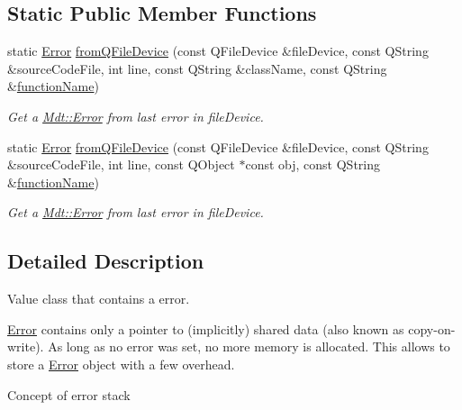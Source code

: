 \subsection*{Static Public Member Functions}
\begin{DoxyCompactItemize}
\item 
static \hyperlink{class_mdt_1_1_error}{Error} \hyperlink{class_mdt_1_1_error_ab8b7aaf497879d1ca16784fae96d3bb3}{from\+Q\+File\+Device} (const Q\+File\+Device \&file\+Device, const Q\+String \&source\+Code\+File, int line, const Q\+String \&class\+Name, const Q\+String \&\hyperlink{class_mdt_1_1_error_a5706a74669219d9672ee20414f805cab}{function\+Name})
\begin{DoxyCompactList}\small\item\em Get a \hyperlink{class_mdt_1_1_error}{Mdt\+::\+Error} from last error in {\itshape file\+Device}. \end{DoxyCompactList}\item 
static \hyperlink{class_mdt_1_1_error}{Error} \hyperlink{class_mdt_1_1_error_a34634c895dff4e9972e8af71dcb10882}{from\+Q\+File\+Device} (const Q\+File\+Device \&file\+Device, const Q\+String \&source\+Code\+File, int line, const Q\+Object $\ast$const obj, const Q\+String \&\hyperlink{class_mdt_1_1_error_a5706a74669219d9672ee20414f805cab}{function\+Name})
\begin{DoxyCompactList}\small\item\em Get a \hyperlink{class_mdt_1_1_error}{Mdt\+::\+Error} from last error in {\itshape file\+Device}. \end{DoxyCompactList}\end{DoxyCompactItemize}


\subsection{Detailed Description}
Value class that contains a error. 

\hyperlink{class_mdt_1_1_error}{Error} contains only a pointer to (implicitly) shared data (also known as copy-\/on-\/write). As long as no error was set, no more memory is allocated. This allows to store a \hyperlink{class_mdt_1_1_error}{Error} object with a few overhead.

Concept of error stack

